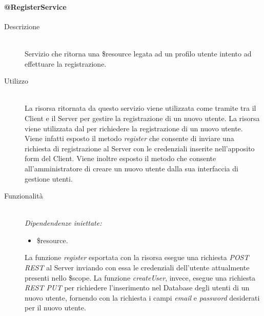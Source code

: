 \paragraph{@RegisterService}
\begin{description}
 \item[Descrizione] \hfill \\
 Servizio che ritorna una \$resource legata ad un profilo utente intento ad effettuare la registrazione. 
 \item[Utilizzo] \hfill \\
 La risorsa ritornata da questo servizio viene utilizzata come tramite tra il Client e il Server per gestire la registrazione di un nuovo utente. 
 La risorsa viene utilizzata dal  per richiedere la registrazione di un nuovo utente. Viene infatti esposto il metodo \textit{register} 
 che consente di inviare una richiesta di registrazione al Server con le credenziali inserite nell'apposito form del Client. Viene inoltre esposto il metodo  che consente all'amministratore di creare un nuovo utente dalla sua interfaccia di gestione utenti.
 \item[Funzionalità] \hfill \\
 \emph{Dipendendenze iniettate:}
 \begin{itemize}
  \item \$resource.
 \end{itemize}
 La funzione \textit{register} esportata con la risorsa esegue una richiesta \textit{POST REST} al Server inviando con essa le credenziali dell'utente 
 attualmente presenti nello \$scope. La funzione \textit{createUser}, invece, esegue una richiesta \textit{REST PUT} per richiedere l'inserimento nel Database degli utenti di un nuovo utente, fornendo con la richiesta i campi \textit{email} e \textit{password} desiderati per il nuovo utente.
\end{description}

